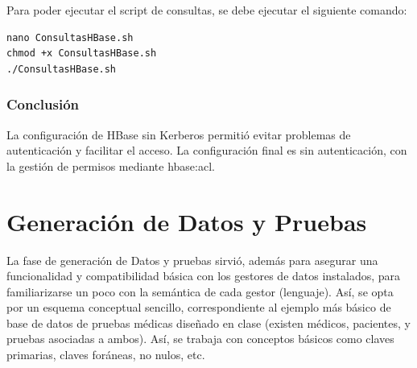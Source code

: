 \documentclass{article}
\begin{document}
Para poder ejecutar el script de consultas, se debe ejecutar el siguiente comando: 

\begin{lstlisting}[style=bashStyle]
nano ConsultasHBase.sh
chmod +x ConsultasHBase.sh
./ConsultasHBase.sh
\end{lstlisting}

\subsubsection{Conclusión}
La configuración de HBase sin Kerberos permitió evitar problemas de autenticación y facilitar el acceso. La configuración final es sin autenticación, con la gestión de permisos mediante hbase:acl.

\section{Generación de Datos y Pruebas}
La fase de generación de Datos y pruebas sirvió, además para asegurar una funcionalidad y compatibilidad básica con los gestores de datos instalados, para familiarizarse un poco con la semántica de cada gestor (lenguaje). 
Así, se opta por un esquema conceptual sencillo, correspondiente al ejemplo más básico de base de datos de pruebas médicas diseñado en clase (existen médicos, pacientes, y pruebas asociadas a ambos). Así, se trabaja con conceptos básicos como claves primarias, claves foráneas, no nulos, etc.
\end{document}
